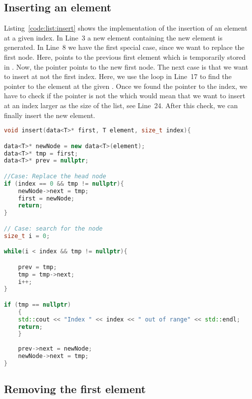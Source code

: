 \documentclass[11pt,fleqn]{book} %
\begin{document}
\subsection*{Inserting an element}
Listing~\ref{code:list:insert} shows the implementation of the insertion of an element at a given index. In Line~3 a new element  containing the new element is generated. In Line~8 we have the first special case, since we want to replace the first node. Here,  points to the previous first element which is temporarily stored in . Now, the pointer  points to the new first node. The next case is that we want to insert at not the first index. Here, we use the  loop in Line~17 to find the pointer to the element at the given . Once we found the pointer to the index, we have to check if the pointer is not the  which would mean that we want to insert at an index larger as the size of the list, see Line~24. After this check, we can finally insert the new element.

\begin{lstlisting}[language=c++,caption={Implementation of the \cpp{insert} function of a linked list.\label{code:list:insert}},float,floatplacement=tb]
void insert(data<T>* first, T element, size_t index){

data<T>* newNode = new data<T>(element);
data<T>* tmp = first;
data<T>* prev = nullptr;

//Case: Replace the head node
if (index == 0 && tmp != nullptr){
    newNode->next = tmp;
    first = newNode;
    return;
}

// Case: search for the node
size_t i = 0;

while(i < index && tmp != nullptr){

    prev = tmp;
    tmp = tmp->next;
    i++;
}

if (tmp == nullptr)
    {
    std::cout << "Index " << index << " out of range" << std::endl;
    return;
    }
    
    prev->next = newNode;    
    newNode->next = tmp;
}
\end{lstlisting}


\subsection*{Removing the first element}
\end{document}

